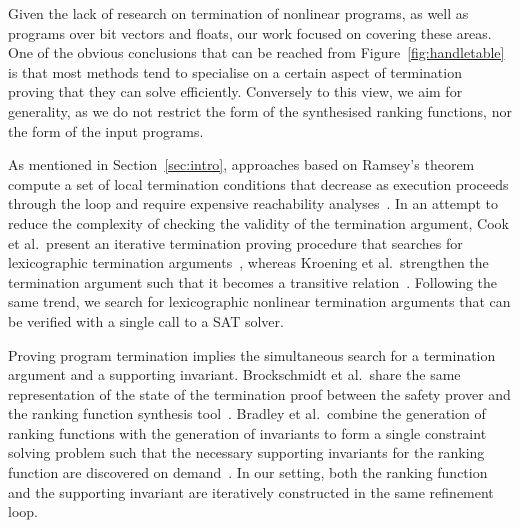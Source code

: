 \documentclass[preprint]{sigplanconf}
\theoremstyle{definition}
\begin{document}
Given the lack of research on termination of nonlinear programs, as well as
programs over bit vectors and floats, our work focused on covering these
areas.  One of the obvious conclusions that can be reached from
Figure~\ref{fig:handletable} is that most methods tend to specialise on a
certain aspect of termination proving that they can solve efficiently. 
Conversely to this view, we aim for generality, as we do not restrict the
form of the synthesised ranking functions, nor the form of the input
programs. 



As mentioned in Section~\ref{sec:intro}, approaches based on Ramsey's
theorem compute a set of local termination conditions that decrease as
execution proceeds through the loop and require expensive reachability
analyses~\cite{DBLP:conf/lpe/CodishG03, DBLP:conf/lics/PodelskiR04,
DBLP:conf/pldi/CookPR06}.  In an attempt to reduce the complexity of
checking the validity of the termination argument, Cook et al.~present an
iterative termination proving procedure that searches for lexicographic
termination arguments~\cite{DBLP:conf/tacas/CookSZ13}, whereas Kroening et
al.~strengthen the termination argument such that it becomes a transitive
relation~\cite{DBLP:conf/cav/KroeningSTW10}. Following the same trend, 
we search for lexicographic nonlinear termination arguments that can be verified 
with a single call to a SAT solver. 


Proving program termination implies the simultaneous search for a
termination argument and a supporting invariant.  Brock\-schmidt et
al.~share the same representation of the state of the termination proof
between the safety prover and the ranking function synthesis
tool~\cite{DBLP:conf/cav/BrockschmidtCF13}.  Bradley et al.~combine the
generation of ranking functions with the generation of invariants to form a
single constraint solving problem such that the necessary supporting
invariants for the ranking function are discovered on
demand~\cite{DBLP:conf/cav/BradleyMS05}.  In our setting, both the ranking
function and the supporting invariant are iteratively constructed in the
same refinement loop.
\end{document}
